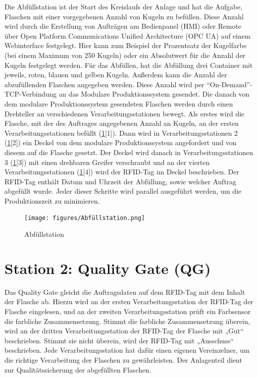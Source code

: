 Die Abfüllstation ist der Start des Kreislaufs der Anlage und hat die Aufgabe, Flaschen mit einer vorgegebenen Anzahl von Kugeln zu befüllen. 
Diese Anzahl wird durch 
die Erstellung von Aufträgen am Bedienpanel (HMI) oder Remote über Open Platform Communications Unified Architecture (OPC UA) auf einem 
Webinterface festgelegt. Hier kann zum Beispiel der Prozentsatz der Kugelfarbe (bei einem Maximum 
von 250 Kugeln) oder ein Absolutwert für die Anzahl der Kugeln festgelegt werden. Für das Abfüllen, hat die Abfüllung drei 
Container mit jeweils, roten, blauen und gelben Kugeln. Außerdem kann die Anzahl der abzufüllenden Flaschen angegeben 
werden. Diese Anzahl wird per ``On-Demand''-TCP-Verbindung an das Modulare Produktionssystem gesendet. Die danach von dem 
modulare Produktionssystem gesendeten Flaschen werden durch einen Drehteller an verschiedenen Verarbeitungsstationen bewegt. 
Als erstes wird die Flasche, mit der des Auftrages angegebenen Anzahl an Kugeln, an der ersten Verarbeitungsstationen befüllt 
(\ref{fig:Abfüllung}[1]). Dann wird in Verarbeitungsstationen 2 (\ref{fig:Abfüllung}[2]) ein Deckel von dem modulare 
Produktionssystem angefordert und von diesem auf die Flasche gesetzt. Der Deckel wird danach in Verarbeitungsstationen 3 
(\ref{fig:Abfüllung}[3]) mit einen drehbaren Greifer verschraubt 
und an der vierten Verarbeitungsstationen (\ref{fig:Abfüllung}[4]) wird der RFID-Tag im Deckel beschrieben. Der RFID-Tag enthält Datum und Uhrzeit der Abfüllung, sowie welcher 
Auftrag abgefüllt wurde. Jeder dieser Schritte wird parallel ausgeführt werden, um die Produktionszeit zu minimieren.

\begin{figure}[h!]
    \centering
    \texttt{[image: figures/Abfüllstation.png]}
    \caption{Abfüllstation\cite{siemens2022}} %
    \label{fig:Abfüllung} %
\end{figure}
\FloatBarrier
\section{Station 2: Quality Gate (QG)}\label{sec:Station 3: Quality Gate}

Das Quality Gate gleicht die Auftragsdaten auf dem RFID-Tag mit dem Inhalt der Flasche ab. Hierzu wird an der ersten Verarbeitungsstation der 
RFID-Tag der Flasche eingelesen, und an der zweiten Verarbeitungsstation prüft ein Farbsensor die farbliche Zusammensetzung. Stimmt die farbliche 
Zusammensetzung überein, wird an der dritten Verarbeitungsstation der RFID-Tag der Flasche mit „Gut“ beschrieben. Stimmt sie nicht überein, 
wird der RFID-Tag mit „Ausschuss“ beschrieben. Jede Verarbeitungsstation hat dafür einen eigenen Vereinzelner, um die richtige Verarbeitung der 
Flaschen zu gewährleisten. Der Anlagenteil dient zur Qualitätssicherung der abgefüllten Flaschen.

